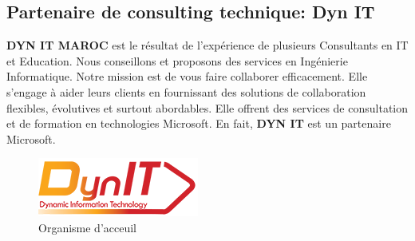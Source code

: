 \documentclass[a4paper]{report}
\begin{document}
\begin{doublespace}
    \subsection{Partenaire de consulting technique: Dyn IT}
    \textbf{DYN IT MAROC} est le résultat de l’expérience de plusieurs
    Consultants en IT et Education.
    Nous conseillons et proposons des services en Ingénierie Informatique.
    Notre mission est de
    vous faire collaborer efficacement. Elle s'engage à aider leurs clients
    en fournissant des solutions de collaboration flexibles, évolutives et
    surtout abordables.
    Elle offrent des services de consultation et de formation en technologies
    Microsoft. En fait,
    \textbf{DYN IT} est un partenaire Microsoft.
    \begin{figure}[H]
        \begin{center}
            \includegraphics[scale=0.6]{images/dynit.png}
            \caption{Organisme d'acceuil}
        \end{center}
    \end{figure}

\end{doublespace}
\end{document}
